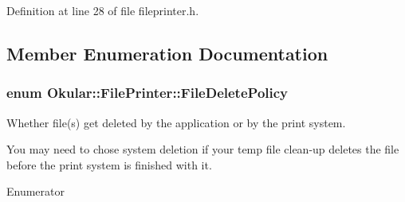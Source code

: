 Definition at line 28 of file fileprinter.\+h.



\subsection{Member Enumeration Documentation}
\hypertarget{classOkular_1_1FilePrinter_acd01eb48e99f9289a7f4786a366ef7ba}{
\subsubsection[{File\+Delete\+Policy}]{\setlength{\rightskip}{0pt plus 5cm}enum {\bf Okular\+::\+File\+Printer\+::\+File\+Delete\+Policy}}}\label{classOkular_1_1FilePrinter_acd01eb48e99f9289a7f4786a366ef7ba}
Whether file(s) get deleted by the application or by the print system.

You may need to chose system deletion if your temp file clean-\/up deletes the file before the print system is finished with it. \begin{Desc}
\item[Enumerator]\par
\begin{description}
\item[{\em 
\hypertarget{classOkular_1_1FilePrinter_acd01eb48e99f9289a7f4786a366ef7baa3dc2e24676385e73e2e9f623c49cc94a}{Application\+Deletes\+Files}\label{classOkular_1_1FilePrinter_acd01eb48e99f9289a7f4786a366ef7baa3dc2e24676385e73e2e9f623c49cc94a}
}]\item[{\em 
\hypertarget{classOkular_1_1FilePrinter_acd01eb48e99f9289a7f4786a366ef7baa86d9b928c2434b89a15de26c8cc22705}{System\+Deletes\+Files}\label{classOkular_1_1FilePrinter_acd01eb48e99f9289a7f4786a366ef7baa86d9b928c2434b89a15de26c8cc22705}
}]\end{description}
\end{Desc}


